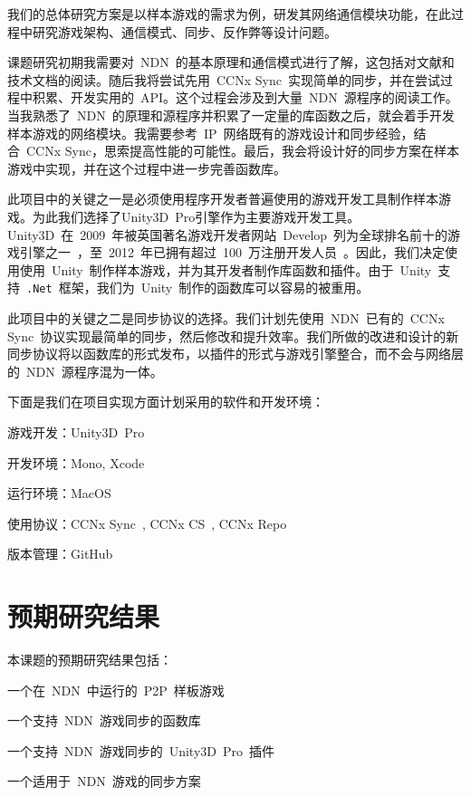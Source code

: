 我们的总体研究方案是以样本游戏的需求为例，研发其网络通信模块功能，在此过程中研究游戏架构、通信模式、同步、反作弊等设计问题。

课题研究初期我需要对~NDN~的基本原理和通信模式进行了解，这包括对文献和技术文档的阅读。随后我将尝试先用~CCNx Sync~实现简单的同步，并在尝试过程中积累、开发实用的~API。这个过程会涉及到大量~NDN~源程序的阅读工作。当我熟悉了~NDN~的原理和源程序并积累了一定量的库函数之后，就会着手开发样本游戏的网络模块。我需要参考~IP~网络既有的游戏设计和同步经验，结合~CCNx Sync，思索提高性能的可能性。最后，我会将设计好的同步方案在样本游戏中实现，并在这个过程中进一步完善函数库。

此项目中的关键之一是必须使用程序开发者普遍使用的游戏开发工具制作样本游戏。为此我们选择了Unity3D\tm~Pro引擎作为主要游戏开发工具。Unity3D\tm~在~2009~年被英国著名游戏开发者网站~Develop~列为全球排名前十的游戏引擎之一~\cite{unityrank}，至~2012~年已拥有超过~100~万注册开发人员~\cite{unityppl}。因此，我们决定使用使用~Unity\tm~制作样本游戏，并为其开发者制作库函数和插件。由于~Unity\tm~支持~\verb|.Net|~框架，我们为~Unity\tm~制作的函数库可以容易的被重用。

此项目中的关键之二是同步协议的选择。我们计划先使用~NDN~已有的~CCNx Sync~协议实现最简单的同步，然后修改和提升效率。我们所做的改进和设计的新同步协议将以函数库的形式发布，以插件的形式与游戏引擎整合，而不会与网络层的~NDN~源程序混为一体。

下面是我们在项目实现方面计划采用的软件和开发环境：
\begin{itemize*}
\item 游戏开发：Unity3D\tm~Pro
\item 开发环境：Mono\tm, Xcode\tm
\item 运行环境：MacOS\tm
\item 使用协议：CCNx Sync~\cite{CCNxSync}, CCNx CS~\cite{CCNxCS}, CCNx Repo~\cite{CCNxRepo}
\item 版本管理：GitHub\tm
\end{itemize*}


\section{预期研究结果}
本课题的预期研究结果包括：
\begin{itemize*}
\item 一个在~NDN~中运行的~P2P~样板游戏
\item 一个支持~NDN~游戏同步的函数库
\item 一个支持~NDN~游戏同步的~Unity3D\tm~Pro~插件
\item 一个适用于~NDN~游戏的同步方案
\end{itemize*}








